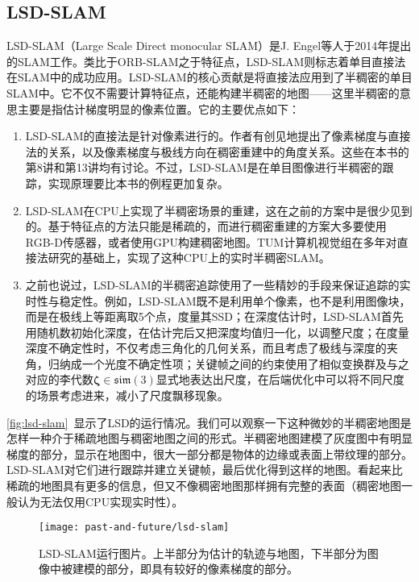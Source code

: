 \subsection{LSD-SLAM}

LSD-SLAM（Large Scale Direct monocular SLAM）是J. Engel等人于2014年提出的SLAM工作\textsuperscript{\cite{Engel2013, Engel2014}}。类比于ORB-SLAM之于特征点，LSD-SLAM则标志着单目直接法在SLAM中的成功应用。LSD-SLAM的核心贡献是将直接法应用到了半稠密的单目SLAM中。它不仅不需要计算特征点，还能构建半稠密的地图——这里半稠密的意思主要是指估计梯度明显的像素位置。它的主要优点如下：

\begin{enumerate}
	\item LSD-SLAM的直接法是针对像素进行的。作者有创见地提出了像素梯度与直接法的关系，以及像素梯度与极线方向在稠密重建中的角度关系。这些在本书的第8讲和第13讲均有讨论。不过，LSD-SLAM是在单目图像进行半稠密的跟踪，实现原理要比本书的例程更加复杂。
	\item LSD-SLAM在CPU上实现了半稠密场景的重建，这在之前的方案中是很少见到的。基于特征点的方法只能是稀疏的，而进行稠密重建的方案大多要使用RGB-D传感器，或者使用GPU构建稠密地图\textsuperscript{\cite{Kerl2013}}。TUM计算机视觉组在多年对直接法研究的基础上，实现了这种CPU上的实时半稠密SLAM。
	\item 之前也说过，LSD-SLAM的半稠密追踪使用了一些精妙的手段来保证追踪的实时性与稳定性。例如，LSD-SLAM既不是利用单个像素，也不是利用图像块，而是在极线上等距离取5个点，度量其SSD；在深度估计时，LSD-SLAM首先用随机数初始化深度，在估计完后又把深度均值归一化，以调整尺度；在度量深度不确定性时，不仅考虑三角化的几何关系，而且考虑了极线与深度的夹角，归纳成一个光度不确定性项；关键帧之间的约束使用了相似变换群及与之对应的李代数$\bm{\zeta} \in \mathfrak{sim}(3)$显式地表达出尺度，在后端优化中可以将不同尺度的场景考虑进来，减小了尺度飘移现象。
\end{enumerate}

\autoref{fig:lsd-slam}~显示了LSD的运行情况。我们可以观察一下这种微妙的半稠密地图是怎样一种介于稀疏地图与稠密地图之间的形式。半稠密地图建模了灰度图中有明显梯度的部分，显示在地图中，很大一部分都是物体的边缘或表面上带纹理的部分。LSD-SLAM对它们进行跟踪并建立关键帧，最后优化得到这样的地图。看起来比稀疏的地图具有更多的信息，但又不像稠密地图那样拥有完整的表面（稠密地图一般认为无法仅用CPU实现实时性）。

\begin{figure}[!ht]
	\centering
	\texttt{[image: past-and-future/lsd-slam]}
	\caption{LSD-SLAM运行图片。上半部分为估计的轨迹与地图，下半部分为图像中被建模的部分，即具有较好的像素梯度的部分。}
	\label{fig:lsd-slam}
\end{figure}

